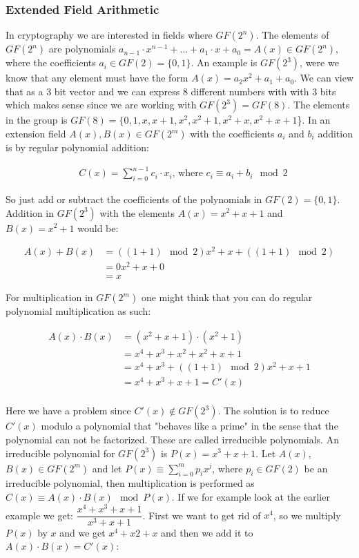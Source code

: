 \subsubsection{Extended Field Arithmetic}
In cryptography we are interested in fields where $GF(2^n)$. The elements of $GF(2^n)$ are  polynomials $a_{n-1} \cdot x^{n-1} +...+a_1 \cdot x + a_0 = A(x) \in GF(2^n)$, where the coefficients $a_i \in GF(2)=\{0,1\}$. An example is $GF(2^3)$, were we know that any element must have the form $A(x)=a_2 x^2 + a_1 + a_0$. We can view that as a 3 bit vector and we can express 8 different numbers with with 3 bits which makes sense since we are working with $GF(2^3)=GF(8)$. The elements in the group is $GF(8)=\{0,1, x, x+1, x^2, x^2+1, x^2+x, x^2+x+1$\}.
In an extension field $A(x),B(x) \in GF(2^m)$ with the coefficients $a_i$ and $b_i$ addition is by regular polynomial addition:

\begin{align*}
      &C(x) = \sum_{i=0}^{n-1} c_i \cdot x_i \text{, where } c_i \equiv a_i+b_i \mod 2
\end{align*}

\noindent So just add or subtract the coefficients of the polynomials in $GF(2)=\{0,1\}$. Addition in $GF(2^3)$ with the elements $A(x)=x^2+x+1$ and $B(x)=x^2+1$ would be:

\begin{align*}
    A(x) + B(x) &= ((1+1) \mod 2) x^2 + x + ((1+1) \mod 2) \\
    &= 0 x^2 + x + 0 \\
    &= x
\end{align*}

\noindent For multiplication in $GF(2^m)$ one might think that you can do regular polynomial multiplication as such:

\begin{align*}
    A(x) \cdot B(x) &= (x^2 + x + 1) \cdot  (x^2 + 1) \\
    &= x^4 + x^3 + x^2 + x^2 + x + 1 \\
    &= x^4 + x^3 + ((1+1) \mod 2) x^2 + x + 1 \\
    &= x^4 + x^3 + x + 1 = C'(x)\\
\end{align*}

\noindent Here we have a problem since $C'(x) \not\in GF(2^3)$. The solution is to reduce $C'(x)$ modulo a polynomial that "behaves like a prime" in the sense that the polynomial can not be factorized. These are called irreducible polynomials. An irreducible polynomial for $GF(2^3)$ is $P(x)=x^3+x+1$. Let $A(x)$,\ $B(x) \in GF(2^m)$ and let $P(x) \equiv \sum_{i=0}^m p_i x^j$, where $p_i \in GF(2)$ be an irreducible polynomial, then multiplication is performed as $C(x) \equiv A(x) \cdot B(x) \mod  P(x)$. If we for example look at the earlier example we get: $\dfrac{x^4 + x^3 + x + 1}{x^3+x+1}$. First we want to get rid of $x^4$, so we multiply $P(x)$ by $x$ and we get $x^4+x2+x$ and then we add it to $A(x) \cdot B(x) = C'(x)$:

